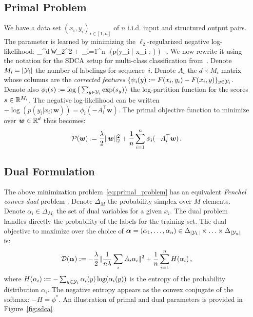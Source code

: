 \subsection{Primal Problem}
We have a data set $(x_i, y_i)_{i \in [1,n]}$ of $n$ i.i.d. input and structured output pairs.
The parameter is learned by minimizing the $\ell_2$-regularized negative log-likelihood:
\beq\label{negative log-likelihood}
	\min_{\bw \in \real^d} \: \| \bm w\|_2^2 +  \sum_{i=1}^{n} -\log\left(p(y_i | x_i ; \bw) \right) \, .
\eeq
We now rewrite it using the notation for the SDCA setup for multi-class classification from~\citet{shalev2016accelerated}.
Denote $M_i = |{\mathcal Y}_i|$ the number of labelings for sequence~$i$.
Denote $A_i$ the $d \times M_i$ matrix whose columns are the \textit{corrected features} $\{\psi_i(y) := F(x_i, y_i) - F(x_i, y)\}_{y \in {\mathcal Y}_i}$.
Denote also $\phi_i(s) := \log \big(\sum_{y \in {\mathcal Y}_i} \exp(s_y)\big)$ the log-partition function for the scores $s \in \mathbb{R}^{M_i}$. The negative log-likelihood can be written $-\log(p(y_i|x_i ;\bm w)) = \phi_i(-A_i^{\top} \bm w)$. The primal objective function to minimize over $\bm w \in \mathbb{R}^d$ thus  becomes:
\begin{equation}
	\label{eq:primal_problem}
	{\mathcal P}(\bm w) := \frac{\lambda}{2}\| \bm w\|_2^2
	+ \frac{1}{n}   \sum_{i=1}^{n} \phi_i(-A_i^{\top} \bm w) \, .
\end{equation}

\subsection{Dual Formulation}
The above minimization problem~\eqref{eq:primal_problem} has an equivalent {\it Fenchel convex dual} problem \citep{lebanon2002boosting}.
Denote $\Delta_{M}$ the probability simplex over $M$ elements.
Denote $\alpha_i \in \Delta_{M_i}$ the set of dual variables for a given $x_i$.
The dual problem handles directly the probability of the labels for the training set.
The dual objective to maximize over the choice of $\boldsymbol{\alpha} = (\alpha_1, \ldots, \alpha_n) \in \Delta_{|{\mathcal Y}_1|} \times \ldots \times \Delta_{|{\mathcal Y}_n|} $ is:
\begin{equation}
	\label{dual problem}
	{\mathcal D}(\boldsymbol{\alpha}) := -\frac{\lambda}{2} \| \frac{1}{n \lambda} \sum_i A_i \alpha_i \|^2
	+ \frac{1}{n} \sum_{i=1}^n H(\alpha_i) \, ,
\end{equation}
where $H(\alpha_i) := - \sum_{y \in {\mathcal Y}_i} \alpha_i(y) \log(\alpha_i(y))$ is the entropy of the probability distribution $\alpha_i$. The negative entropy appears as the convex conjugate of the softmax: $-H = \phi^*$. 
An illustration of primal and dual parameters is provided in Figure~\ref{fig:sdca}

